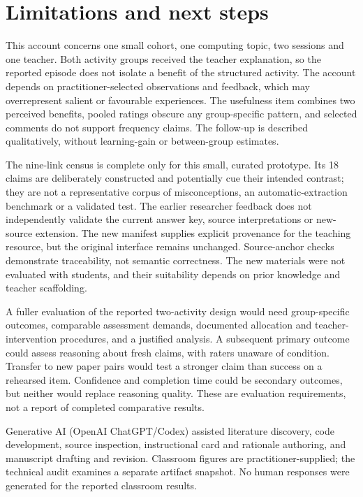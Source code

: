 \section{Limitations and next steps}
This account concerns one small cohort, one computing topic, two sessions and one teacher. Both activity groups received the teacher explanation, so the reported episode does not isolate a benefit of the structured activity. The account depends on practitioner-selected observations and feedback, which may overrepresent salient or favourable experiences. The usefulness item combines two perceived benefits, pooled ratings obscure any group-specific pattern, and selected comments do not support frequency claims. The follow-up is described qualitatively, without learning-gain or between-group estimates.

The nine-link census is complete only for this small, curated prototype. Its 18 claims are deliberately constructed and potentially cue their intended contrast; they are not a representative corpus of misconceptions, an automatic-extraction benchmark or a validated test. The earlier researcher feedback does not independently validate the current answer key, source interpretations or new-source extension. The new manifest supplies explicit provenance for the teaching resource, but the original interface remains unchanged. Source-anchor checks demonstrate traceability, not semantic correctness. The new materials were not evaluated with students, and their suitability depends on prior knowledge and teacher scaffolding.

A fuller evaluation of the reported two-activity design would need group-specific outcomes, comparable assessment demands, documented allocation and teacher-intervention procedures, and a justified analysis. A subsequent primary outcome could assess reasoning about fresh claims, with raters unaware of condition. Transfer to new paper pairs would test a stronger claim than success on a rehearsed item. Confidence and completion time could be secondary outcomes, but neither would replace reasoning quality. These are evaluation requirements, not a report of completed comparative results.

Generative AI (OpenAI ChatGPT/Codex) assisted literature discovery, code development, source inspection, instructional card and rationale authoring, and manuscript drafting and revision. Classroom figures are practitioner-supplied; the technical audit examines a separate artifact snapshot. No human responses were generated for the reported classroom results.

